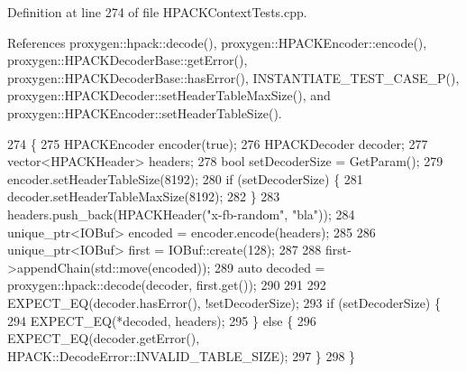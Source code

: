 Definition at line 274 of file H\+P\+A\+C\+K\+Context\+Tests.\+cpp.



References proxygen\+::hpack\+::decode(), proxygen\+::\+H\+P\+A\+C\+K\+Encoder\+::encode(), proxygen\+::\+H\+P\+A\+C\+K\+Decoder\+Base\+::get\+Error(), proxygen\+::\+H\+P\+A\+C\+K\+Decoder\+Base\+::has\+Error(), I\+N\+S\+T\+A\+N\+T\+I\+A\+T\+E\+\_\+\+T\+E\+S\+T\+\_\+\+C\+A\+S\+E\+\_\+\+P(), proxygen\+::\+H\+P\+A\+C\+K\+Decoder\+::set\+Header\+Table\+Max\+Size(), and proxygen\+::\+H\+P\+A\+C\+K\+Encoder\+::set\+Header\+Table\+Size().


\begin{DoxyCode}
274                                          \{
275   HPACKEncoder encoder(\textcolor{keyword}{true});
276   HPACKDecoder decoder;
277   vector<HPACKHeader> headers;
278   \textcolor{keywordtype}{bool} setDecoderSize = GetParam();
279   encoder.setHeaderTableSize(8192);
280   \textcolor{keywordflow}{if} (setDecoderSize) \{
281     decoder.setHeaderTableMaxSize(8192);
282   \}
283   headers.push\_back(HPACKHeader(\textcolor{stringliteral}{"x-fb-random"}, \textcolor{stringliteral}{"bla"}));
284   unique\_ptr<IOBuf> encoded = encoder.encode(headers);
285 
286   unique\_ptr<IOBuf> first = IOBuf::create(128);
287 
288   first->appendChain(std::move(encoded));
289   \textcolor{keyword}{auto} decoded = proxygen::hpack::decode(decoder, first.get());
290 
291 
292   EXPECT\_EQ(decoder.hasError(), !setDecoderSize);
293   \textcolor{keywordflow}{if} (setDecoderSize) \{
294     EXPECT\_EQ(*decoded, headers);
295   \} \textcolor{keywordflow}{else} \{
296     EXPECT\_EQ(decoder.getError(), HPACK::DecodeError::INVALID\_TABLE\_SIZE);
297   \}
298 \}
\end{DoxyCode}
